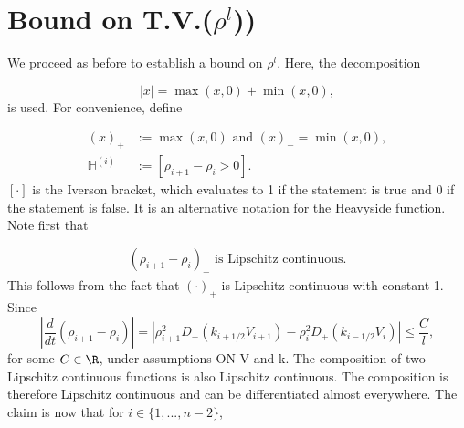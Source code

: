 \section{Bound on T.V.($\rho^l$))} \label{section:tv_rho}
We proceed as before to establish a bound on $\rho^l$. Here, the decomposition 

\begin{equation}
\left| x \right| = \max(x,0) + \min(x,0),
\end{equation}
is used. For convenience, define 

\begin{align}
	(x)_+ &:= \max(x,0) \text{ and } (x)_{-} = \min(x,0), \\
	\mathbb{H}^(i) &:= [\rho_{i+1} - \rho_{i} > 0]. \label{Iverson}
\end{align}
$[\cdot]$ is the Iverson bracket, which evaluates to 1 if the statement is true and 0 if the statement is false. It is an alternative notation for the Heavyside function. 
Note first that 

\begin{equation} \label{diffrhomax_lipschitz}
	(\rho_{i+1} - \rho_i)_+ \text{ is Lipschitz continuous}.
\end{equation}
This follows from the fact that $(\cdot)_+$ is Lipschitz continuous with constant 1. Since 
\begin{equation}
	\left|\frac{d}{dt} (\rho_{i+1} - \rho_i) \right|= \left| \rho_{i+1}^2D_+(k_{i+1/2}V_{i+1}) - \rho_{i}^2D_+(k_{i-1/2}V_i)\right| \leq \frac{C}{l}, 
\end{equation}
for some $C \in \R$, under assumptions ON V and k. The composition of two Lipschitz continuous functions is also Lipschitz continuous. The composition is therefore Lipschitz continuous and can be differentiated almost everywhere. The claim is now that for $i \in \{1,...,n-2\}$,

